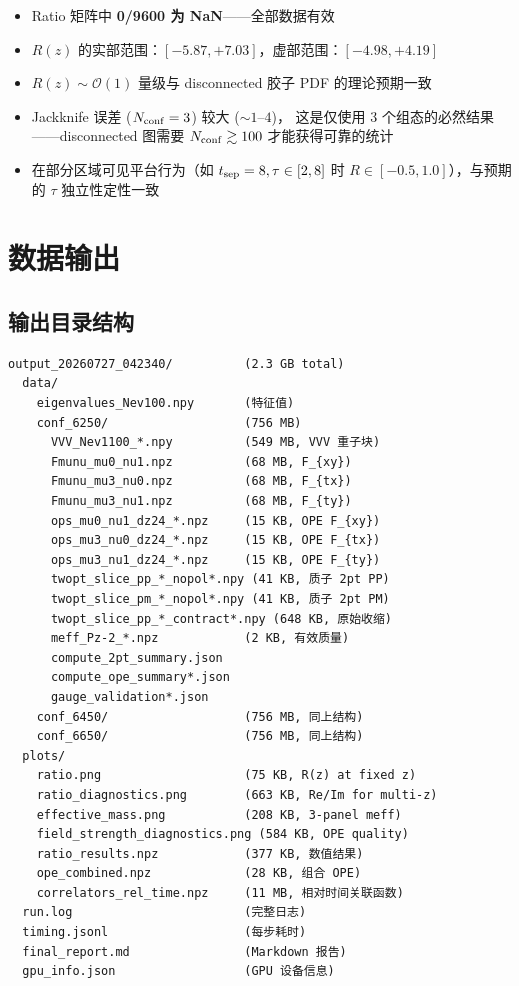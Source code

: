 \documentclass[11pt,a4paper]{article}
\begin{document}
\begin{itemize}
  \item Ratio 矩阵中 \textbf{0/9600 为 NaN}——全部数据有效
  \item $R(z)$ 的实部范围：$[-5.87, +7.03]$，虚部范围：$[-4.98, +4.19]$
  \item $R(z) \sim \mathcal{O}(1)$ 量级与 disconnected 胶子 PDF 的理论预期一致
  \item Jackknife 误差 ($N_{\rm conf}=3$) 较大 ($\sim 1$--$4$)，
    这是仅使用 3 个组态的必然结果——disconnected 图需要 $N_{\rm conf} \gtrsim 100$
    才能获得可靠的统计
  \item 在部分区域可见平台行为（如 $t_{\rm sep}=8, \tau \in [2,8]$ 时
    $R \in [-0.5, 1.0]$），与预期的 $\tau$ 独立性定性一致
\end{itemize}

\section{数据输出}

\subsection{输出目录结构}

\begin{lstlisting}[basicstyle=\ttfamily\small,frame=single]
output_20260727_042340/          (2.3 GB total)
  data/
    eigenvalues_Nev100.npy       (特征值)
    conf_6250/                   (756 MB)
      VVV_Nev1100_*.npy          (549 MB, VVV 重子块)
      Fmunu_mu0_nu1.npz          (68 MB, F_{xy})
      Fmunu_mu3_nu0.npz          (68 MB, F_{tx})
      Fmunu_mu3_nu1.npz          (68 MB, F_{ty})
      ops_mu0_nu1_dz24_*.npz     (15 KB, OPE F_{xy})
      ops_mu3_nu0_dz24_*.npz     (15 KB, OPE F_{tx})
      ops_mu3_nu1_dz24_*.npz     (15 KB, OPE F_{ty})
      twopt_slice_pp_*_nopol*.npy (41 KB, 质子 2pt PP)
      twopt_slice_pm_*_nopol*.npy (41 KB, 质子 2pt PM)
      twopt_slice_pp_*_contract*.npy (648 KB, 原始收缩)
      meff_Pz-2_*.npz            (2 KB, 有效质量)
      compute_2pt_summary.json
      compute_ope_summary*.json
      gauge_validation*.json
    conf_6450/                   (756 MB, 同上结构)
    conf_6650/                   (756 MB, 同上结构)
  plots/
    ratio.png                    (75 KB, R(z) at fixed z)
    ratio_diagnostics.png        (663 KB, Re/Im for multi-z)
    effective_mass.png           (208 KB, 3-panel meff)
    field_strength_diagnostics.png (584 KB, OPE quality)
    ratio_results.npz            (377 KB, 数值结果)
    ope_combined.npz             (28 KB, 组合 OPE)
    correlators_rel_time.npz     (11 MB, 相对时间关联函数)
  run.log                        (完整日志)
  timing.jsonl                   (每步耗时)
  final_report.md                (Markdown 报告)
  gpu_info.json                  (GPU 设备信息)
\end{lstlisting}
\end{document}
